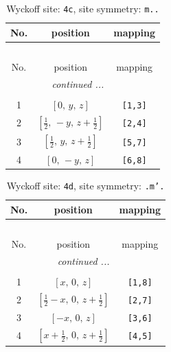 \documentclass[fleqn,8pt]{jsarticle}
\begin{document}
\renewcommand{\arraystretch}{1.2}
\begin{longtable}{ccc}
\caption{Wyckoff site: {\tt 4c}, site symmetry: {\tt m..}}
 \\
 \hline \hline
No. & position & mapping \\ \hline \endfirsthead

\multicolumn{2}{l}{\tablename\ \thetable{}} \\
 \hline \hline
No. & position & mapping \\ \hline \endhead

 \hline \hline
\multicolumn{2}{r}{\footnotesize\it continued ...} \\ \endfoot

 \hline \hline
\multicolumn{2}{r}{} \\ \endlastfoot

1 & $\left[ 0,\, y,\, z \right]$ & {\tt [1,3]} \\ \hline
2 & $\left[ \frac{1}{2},\, - y,\, z + \frac{1}{2} \right]$ & {\tt [2,4]} \\ \hline
3 & $\left[ \frac{1}{2},\, y,\, z + \frac{1}{2} \right]$ & {\tt [5,7]} \\ \hline
4 & $\left[ 0,\, - y,\, z \right]$ & {\tt [6,8]} \\
\end{longtable}
\renewcommand{\arraystretch}{1.2}
\begin{longtable}{ccc}
\caption{Wyckoff site: {\tt 4d}, site symmetry: {\tt .m'.}}
 \\
 \hline \hline
No. & position & mapping \\ \hline \endfirsthead

\multicolumn{2}{l}{\tablename\ \thetable{}} \\
 \hline \hline
No. & position & mapping \\ \hline \endhead

 \hline \hline
\multicolumn{2}{r}{\footnotesize\it continued ...} \\ \endfoot

 \hline \hline
\multicolumn{2}{r}{} \\ \endlastfoot

1 & $\left[ x,\, 0,\, z \right]$ & {\tt [1,8]} \\ \hline
2 & $\left[ \frac{1}{2} - x,\, 0,\, z + \frac{1}{2} \right]$ & {\tt [2,7]} \\ \hline
3 & $\left[ - x,\, 0,\, z \right]$ & {\tt [3,6]} \\ \hline
4 & $\left[ x + \frac{1}{2},\, 0,\, z + \frac{1}{2} \right]$ & {\tt [4,5]} \\
\end{longtable}
\end{document}
